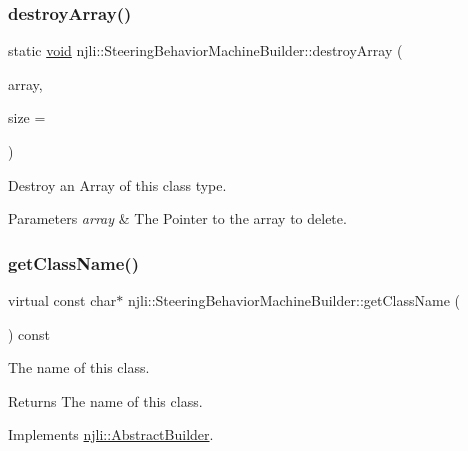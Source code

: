 \subsubsection{\texorpdfstring{destroy\+Array()}{destroyArray()}}
{\footnotesize\ttfamily static \mbox{\hyperlink{_thread_8h_af1e856da2e658414cb2456cb6f7ebc66}{void}} njli\+::\+Steering\+Behavior\+Machine\+Builder\+::destroy\+Array (\begin{DoxyParamCaption}\item[{\mbox{\hyperlink{classnjli_1_1_steering_behavior_machine_builder}{Steering\+Behavior\+Machine\+Builder}} $\ast$$\ast$}]{array,  }\item[{const \mbox{\hyperlink{_util_8h_a10e94b422ef0c20dcdec20d31a1f5049}{u32}}}]{size = {} }\end{DoxyParamCaption})\hspace{0.3cm}{\ttfamily [static]}}

Destroy an Array of this class type.


\begin{DoxyParams}{Parameters}
{\em array} & The Pointer to the array to delete. \\
\hline
\end{DoxyParams}
\mbox{\label{classnjli_1_1_steering_behavior_machine_builder_afd597391c6cf466f377abb59d8166155}} 
\subsubsection{\texorpdfstring{get\+Class\+Name()}{getClassName()}}
{\footnotesize\ttfamily virtual const char$\ast$ njli\+::\+Steering\+Behavior\+Machine\+Builder\+::get\+Class\+Name (\begin{DoxyParamCaption}{ }\end{DoxyParamCaption}) const\hspace{0.3cm}{\ttfamily [virtual]}}

The name of this class.

\begin{DoxyReturn}{Returns}
The name of this class. 
\end{DoxyReturn}


Implements \mbox{\hyperlink{classnjli_1_1_abstract_builder_a902f73ea78031b06aca183a417f3413b}{njli\+::\+Abstract\+Builder}}.

